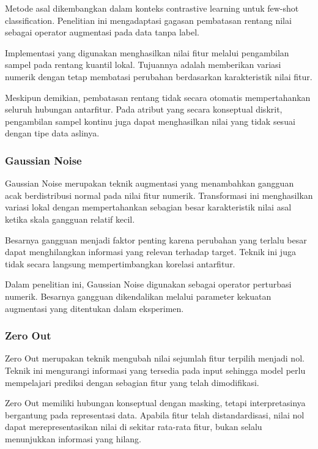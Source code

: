Metode asal dikembangkan dalam konteks contrastive learning untuk few-shot classification. Penelitian ini mengadaptasi gagasan pembatasan rentang nilai sebagai operator augmentasi pada data tanpa label.

Implementasi yang digunakan menghasilkan nilai fitur melalui pengambilan sampel pada rentang kuantil lokal. Tujuannya adalah memberikan variasi numerik dengan tetap membatasi perubahan berdasarkan karakteristik nilai fitur.

Meskipun demikian, pembatasan rentang tidak secara otomatis mempertahankan seluruh hubungan antarfitur. Pada atribut yang secara konseptual diskrit, pengambilan sampel kontinu juga dapat menghasilkan nilai yang tidak sesuai dengan tipe data aslinya.

\subsubsection{Gaussian Noise}

Gaussian Noise merupakan teknik augmentasi yang menambahkan gangguan acak berdistribusi normal pada nilai fitur numerik. Transformasi ini menghasilkan variasi lokal dengan mempertahankan sebagian besar karakteristik nilai asal ketika skala gangguan relatif kecil.

Besarnya gangguan menjadi faktor penting karena perubahan yang terlalu besar dapat menghilangkan informasi yang relevan terhadap target. Teknik ini juga tidak secara langsung mempertimbangkan korelasi antarfitur.

Dalam penelitian ini, Gaussian Noise digunakan sebagai operator perturbasi numerik. Besarnya gangguan dikendalikan melalui parameter kekuatan augmentasi yang ditentukan dalam eksperimen.

\subsubsection{Zero Out}

Zero Out merupakan teknik mengubah nilai sejumlah fitur terpilih menjadi nol. Teknik ini mengurangi informasi yang tersedia pada input sehingga model perlu mempelajari prediksi dengan sebagian fitur yang telah dimodifikasi.

Zero Out memiliki hubungan konseptual dengan masking, tetapi interpretasinya bergantung pada representasi data. Apabila fitur telah distandardisasi, nilai nol dapat merepresentasikan nilai di sekitar rata-rata fitur, bukan selalu menunjukkan informasi yang hilang.

